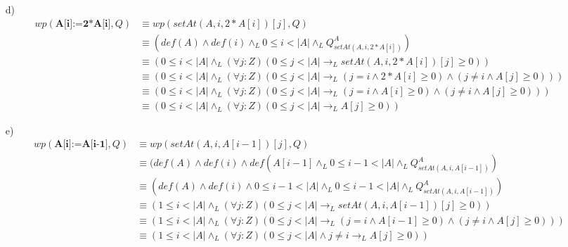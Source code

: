 \documentclass{article}
\begin{document}
{{\begin{itemize}
\begin{align}
        &\equiv (0\leq i+2 <|A| \land_L (\forall j :Z)(0 \leq j < |A| \to_L setAt(A,i+2,-1)[j] \geq 0) )\\
        &\equiv (0\leq i+2 <|A| \land_L (\forall j :Z)(0 \leq j < |A| \to_L (j=i+2 \land -1\geq0) \land (j\neq i \land A[j]\geq0) ))\\
        &\equiv (0\leq i+2 <|A| \land_L (\forall j :Z)(0 \leq j < |A| \to_L \textit{False}\land (j\neq i \land A[j]\geq0) ))\\
        &\equiv (0\leq i+2 <|A| \land_L (\forall j :Z)(0 \leq j < |A| \to_L \textit{False}))\\
        &\equiv (0\leq i+2 <|A| \land_L \textit{False})\\
        &\equiv \textit{False}
    \end{align}
    \textbf{Nota}: deberia haber considerado la lista vacia de manera que si se cumpla el segundo disyunto a partir de (5)
    \item [d) ]
    \setcounter{equation}{0}
    \begin{align}
        wp(\textbf{A[i]:=2*A[i]},Q)&\equiv wp(setAt(A,i,2*A[i])[j],Q)\\
        &\equiv (def(A) \land def(i) \land_L 0\leq i <|A| \land_L Q^A_{setAt(A,i,2*A[i])})\\
        &\equiv (0\leq i <|A| \land_L (\forall j :Z)(0 \leq j < |A| \to_L setAt(A,i,2*A[i])[j] \geq 0) )\\
        &\equiv (0\leq i <|A| \land_L (\forall j :Z)(0 \leq j < |A| \to_L (j=i \land 2*A[i]\geq0) \land (j\neq i \land A[j]\geq0) ))\\
        &\equiv (0\leq i <|A| \land_L (\forall j :Z)(0 \leq j < |A| \to_L (j=i \land A[i]\geq0) \land (j\neq i \land A[j]\geq0) ))\\
        &\equiv (0\leq i <|A| \land_L (\forall j :Z)(0 \leq j < |A| \to_L A[j]\geq0 ))
    \end{align}
    \item [e) ]
    \setcounter{equation}{0}
    \begin{align}
        wp(\textbf{A[i]:=A[i-1]},Q)&\equiv wp(setAt(A,i,A[i-1])[j],Q)\\
        &\equiv (def(A) \land def(i) \land def(A[i-1] \land_L 0\leq i-1 <|A| \land_L Q^A_{setAt(A,i,A[i-1])})\\
        &\equiv (def(A) \land def(i) \land 0\leq i-1<|A| \land_L 0\leq i-1 <|A| \land_L Q^A_{setAt(A,i,A[i-1])})\\
        &\equiv (1\leq i <|A| \land_L (\forall j :Z)(0 \leq j < |A| \to_L setAt(A,i,A[i-1])[j] \geq 0) )\\
        &\equiv (1\leq i <|A| \land_L (\forall j :Z)(0 \leq j < |A| \to_L (j=i \land A[i-1]\geq0) \land (j\neq i \land A[j]\geq0) ))\\
        &\equiv (1\leq i <|A| \land_L (\forall j :Z)(0 \leq j < |A| \land j\neq i \to_L A[j]\geq0 ))
    \end{align}
\end{itemize}}
}
\end{document}
